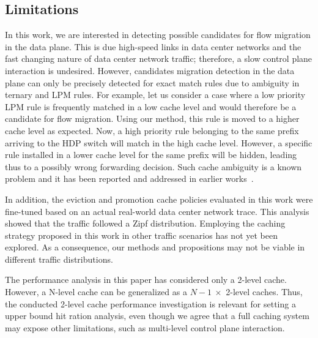 \subsection{Limitations}\label{sec:method:limitations}

In this work, we are interested in detecting possible candidates for flow migration in the data plane.
This is due high-speed links in data center networks and the fast changing nature of data center network traffic; therefore, a slow control plane interaction is undesired.
However, candidates migration detection in the data plane can only be precisely detected for exact match rules due to ambiguity in ternary and LPM rules.
For example, let us consider a case where a low priority LPM rule is frequently matched in a low cache level and would therefore be a candidate for flow migration.
Using our method, this rule is moved to a higher cache level as expected.
Now, a high priority rule belonging to the same prefix arriving to the HDP switch will match in the high cache level.
However, a specific rule installed in a lower cache level for the same prefix will be hidden, leading thus to a possibly wrong forwarding decision.   
Such cache ambiguity is a known problem and it has been reported and addressed in earlier works~\cite{Degermark:1997,Katta:2014}.

In addition, the eviction and promotion cache policies evaluated in this work were fine-tuned based on an actual real-world data center network trace.
This analysis showed that the traffic followed a Zipf distribution.
Employing the caching strategy proposed in this work in other traffic scenarios has not yet been explored.
As a consequence, our methods and propositions may not be viable in different traffic distributions.

The performance analysis in this paper has considered only a 2-level cache.
However, a N-level cache can be generalized as a $N-1~\times$ 2-level caches.
Thus, the conducted 2-level cache performance investigation is relevant for setting a upper bound hit ration analysis, even though we agree that a full caching system may expose other limitations, such as multi-level control plane interaction.